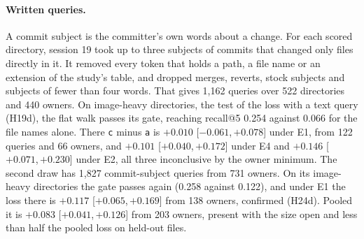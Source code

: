 \documentclass[11pt]{article}
\newcommand{\rep}[1]{\texttt{#1}}
\newcommand{\ci}[2]{[\ensuremath{#1},\,\ensuremath{#2}]}  %
\begin{document}
\paragraph{Written queries.} A commit subject is the committer's own words about a change. For each scored directory, session 19 took up to three subjects of commits that changed only files directly in it. It removed every token that holds a path, a file name or an extension of the study's table, and dropped merges, reverts, stock subjects and subjects of fewer than four words. That gives 1,162 queries over 522 directories and 440 owners. On image-heavy directories, the test of the loss with a text query (H19d), the flat walk passes its gate, reaching recall@5 0.254 against 0.066 for the file names alone. There \rep{c} minus \rep{a} is $+0.010$ \ci{-0.061}{+0.078} under E1, from 122 queries and 66 owners, and $+0.101$ \ci{+0.040}{+0.172} under E4 and $+0.146$ \ci{+0.071}{+0.230} under E2, all three inconclusive by the owner minimum. The second draw has 1,827 commit-subject queries from 731 owners. On its image-heavy directories the gate passes again (0.258 against 0.122), and under E1 the loss there is $+0.117$ \ci{+0.065}{+0.169} from 138 owners, confirmed (H24d). Pooled it is $+0.083$ \ci{+0.041}{+0.126} from 203 owners, present with the size open and less than half the pooled loss on held-out files.
\end{document}
